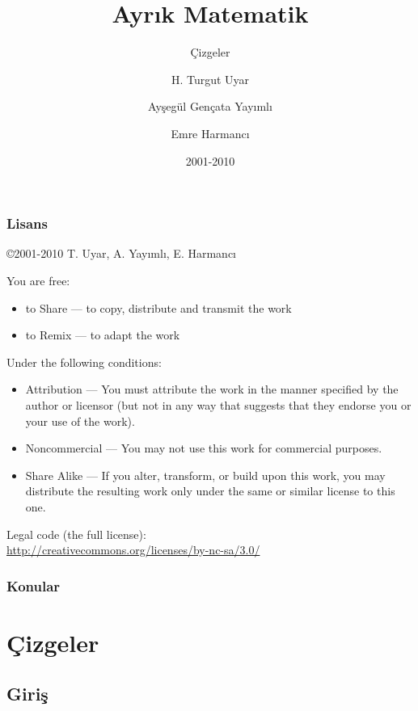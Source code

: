 \documentclass[dvipsnames]{beamer}
\title{Ayrık Matematik}
\subtitle{Çizgeler}
\author{H. Turgut Uyar \and Ayşegül Gençata Yayımlı \and Emre Harmancı}
\date{2001-2010}
\theoremstyle{definition}
\theoremstyle{example}
\theoremstyle{plain}
\begin{document}
\begin{frame}
  \titlepage
\end{frame}

\begin{frame}
  \frametitle{Lisans}

  \hfill
  \copyright 2001-2010 T. Uyar, A. Yayımlı, E. Harmancı

  \vfill
  \begin{tiny}
    You are free:
    \begin{itemize}
      \item to Share — to copy, distribute and transmit the work
      \item to Remix — to adapt the work
    \end{itemize}

    Under the following conditions:
    \begin{itemize}
      \item Attribution — You must attribute the work in the manner specified by
        the author or licensor (but not in any way that suggests that they
        endorse you or your use of the work).

      \item Noncommercial — You may not use this work for commercial purposes.

      \item Share Alike — If you alter, transform, or build upon this work, you
        may distribute the resulting work only under the same or similar license
        to this one.
    \end{itemize}
  \end{tiny}

  \vfill
  Legal code (the full license):\\
  \url{http://creativecommons.org/licenses/by-nc-sa/3.0/}
\end{frame}

\begin{frame}
  \frametitle{Konular}
  \tableofcontents
\end{frame}

\section{Çizgeler}

\subsection{Giriş}
\end{document}
